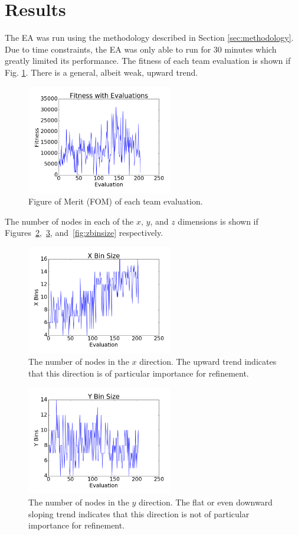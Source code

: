 \documentclass[conference]{IEEEtran}
\begin{document}
\section{Results}
The EA was run using the methodology described in Section \ref{sec:methodology}. Due to time constraints, the EA was only able to run for 30 minutes which greatly limited its performance. The fitness of each team evaluation is shown if Fig. \ref{fig:fitness}. There is a general, albeit weak, upward trend. 

\begin{figure}[!t]
\centering
\includegraphics[width=2.5in]{fitnessplot}
\caption{Figure of Merit (FOM) of each team evaluation.}
\label{fig:fitness}
\end{figure}

The number of nodes in each of the $x$, $y$, and $z$ dimensions is shown if Figures~\ref{fig:xbinsize},~\ref{fig:ybinsize}, and~\ref{fig:zbinsize} respectively.

\begin{figure}[!t]
\centering
\includegraphics[width=2.5in]{xbinsize}
\caption{The number of nodes in the $x$ direction. The upward trend indicates that this direction is of particular importance for refinement.}
\label{fig:xbinsize}
\end{figure}

\begin{figure}[!t]
\centering
\includegraphics[width=2.5in]{ybinsize}
\caption{The number of nodes in the $y$ direction. The flat or even downward sloping trend indicates that this direction is not of particular importance for refinement.}
\label{fig:ybinsize}
\end{figure}
\end{document}
